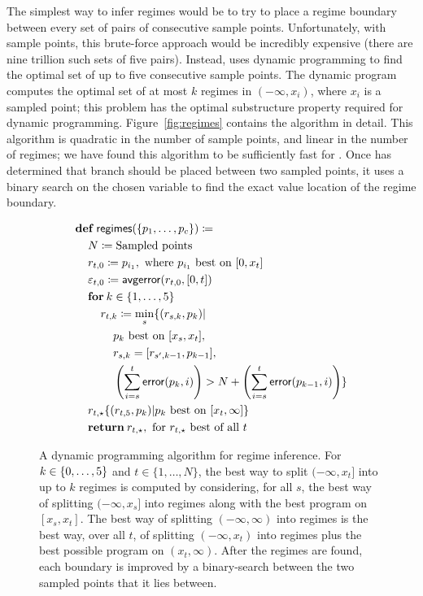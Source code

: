 \documentclass[paper.tex]{subfiles}
\begin{document}
The simplest way to infer regimes would be to try
  to place a regime boundary between every set
  of \nRegimes pairs of consecutive sample points.
Unfortunately, with \nSample sample points,
  this brute-force approach would be incredibly expensive
  (there are nine trillion such sets of five pairs).
Instead, \casio uses dynamic programming
  to find the optimal set of up to five consecutive sample points.
The dynamic program computes the optimal set
  of at most $k$ regimes in $(-\infty, x_i)$, where $x_i$ is a sampled point;
  this problem has the optimal substructure property
  required for dynamic programming.
Figure~\ref{fig:regimes} contains the algorithm in detail.
This algorithm is quadratic in the number of sample points,
  and linear in the number of regimes;
  we have found this algorithm to be sufficiently fast for \casio.
Once \casio has determined that branch should be placed
  between two sampled points,
  it uses a binary search on the chosen variable to 
  find the exact value location of the regime boundary.

\begin{figure}
\begin{footnotesize}
\begin{align*}
  &\!def!\:\mathsf{regimes}(\{p_1, \dotsc, p_c\}) \ceq \\
  &\> N \ceq \text{Sampled points} \\
  &\> r_{t,0} \ceq p_{i_1}, \text{ where } p_{i_1} \text{ best on } [0, x_t] \\
  &\> \varepsilon_{t,0} \ceq \mathsf{avgerror}(r_{t,0}, [0, t]) \\
  &\> \!for!\:k \in \{1, \dotsc, \nRegimes \} \\
  &\> \> r_{t,k} \ceq \min_s \{ (r_{s,k}, p_k) | \\
  &\> \> \> p_k \text{ best on } [x_s, x_t], \\
  &\> \> \> r_{s,k} = [r_{s',k-1}, p_{k-1}], \\
  &\> \> \> \left(\sum_{i = s}^t \mathsf{error}(p_k, i)\right) >
  N + \left(\sum_{i = s}^t \mathsf{error}(p_{k - 1}, i)\right) \} \\
  &\> r_{t,\star} \{ (r_{t,\nRegimes}, p_k) | p_k \text{ best on } [x_t, \infty] \} \\
  &\> \!return!\:r_{t,\star}, \text{ for } r_{t, \star} \text{ best of all } t
\end{align*}
\end{footnotesize}
\caption{A dynamic programming algorithm for regime inference.
  For $k \in \{0,\dotsc,5\}$ and $t \in \{1, \dotsc, N\}$,
    the best way to split $(-\infty, x_t]$ into up to $k$ regimes is computed
    by considering, for all $s$,
    the best way of splitting $(-\infty, x_s]$ into regimes
    along with the best program on $[x_s, x_t]$.
  The best way of splitting $(-\infty, \infty)$ into regimes
    is the best way, over all $t$, of splitting $(-\infty, x_t)$ into regimes
    plus the best possible program on $(x_t, \infty)$.
  After the regimes are found,
    each boundary is improved by a binary-search
    between the two sampled points that it lies between.}
\label{alg:main}
\end{figure}
\end{document}
